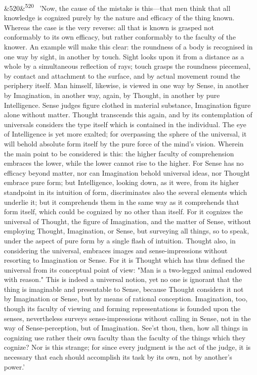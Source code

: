 \documentclass[12pt]{article}
\newcommand{\para}[1][]{\par\noindent\ifx&#1&\else\textsuperscript{\footnotesize #1}~\fi}
\begin{document}
\para[520] 'Now, the cause of the mistake is this---that men think that all knowledge is cognized purely by the nature and efficacy of the thing known. Whereas the case is the very reverse: all that is known is grasped not conformably to its own efficacy, but rather conformably to the faculty of the knower. An example will make this clear: the roundness of a body is recognised in one way by sight, in another by touch. Sight looks upon it from a distance as a whole by a simultaneous reflection of rays; touch grasps the roundness piecemeal, by contact and attachment to the surface, and by actual movement round the periphery itself. Man himself, likewise, is viewed in one way by Sense, in another by Imagination, in another way, again, by Thought, in another by pure Intelligence. Sense judges figure clothed in material substance, Imagination figure alone without matter. Thought transcends this again, and by its contemplation of universals considers the type itself which is contained in the individual. The eye of Intelligence is yet more exalted; for overpassing the sphere of the universal, it will behold absolute form itself by the pure force of the mind's vision. Wherein the main point to be considered is this: the higher faculty of comprehension embraces the lower, while the lower cannot rise to the higher. For Sense has no efficacy beyond matter, nor can Imagination behold universal ideas, nor Thought embrace pure form; but Intelligence, looking down, as it were, from its higher standpoint in its intuition of form, discriminates also the several elements which underlie it; but it comprehends them in the same way as it comprehends that form itself, which could be cognized by no other than itself. For it cognizes the universal of Thought, the figure of Imagination, and the matter of Sense, without employing Thought, Imagination, or Sense, but surveying all things, so to speak, under the aspect of pure form by a single flash of intuition. Thought also, in considering the universal, embraces images and sense-impressions without resorting to Imagination or Sense. For it is Thought which has thus defined the universal from its conceptual point of view: "Man is a two-legged animal endowed with reason." This is indeed a universal notion, yet no one is ignorant that the thing is imaginable and presentable to Sense, because Thought considers it not by Imagination or Sense, but by means of rational conception. Imagination, too, though its faculty of viewing and forming representations is founded upon the senses, nevertheless surveys sense-impressions without calling in Sense, not in the way of Sense-perception, but of Imagination. See'st thou, then, how all things in cognizing use rather their own faculty than the faculty of the things which they cognize? Nor is this strange; for since every judgment is the act of the judge, it is necessary that each should accomplish its task by its own, not by another's power.'
\end{document}
